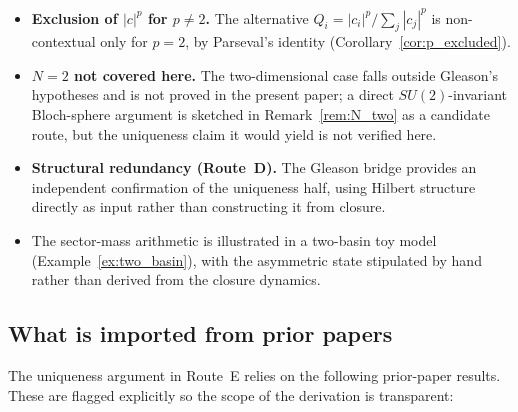 \documentclass[12pt]{article}
\begin{document}
\begin{itemize}
\begin{enumerate}
    \end{enumerate}
    \item \textbf{Exclusion of $|c|^p$ for $p \neq 2$.} The alternative $Q_i = |c_i|^p/\sum_j |c_j|^p$ is non-contextual only for $p = 2$, by Parseval's identity (Corollary~\ref{cor:p_excluded}).
    \item \textbf{$N = 2$ not covered here.} The two-dimensional case falls outside Gleason's hypotheses and is not proved in the present paper; a direct $SU(2)$-invariant Bloch-sphere argument is sketched in Remark~\ref{rem:N_two} as a candidate route, but the uniqueness claim it would yield is not verified here.
    \item \textbf{Structural redundancy (Route~D).} The Gleason bridge provides an independent confirmation of the uniqueness half, using Hilbert structure directly as input rather than constructing it from closure.
    \item The sector-mass arithmetic is illustrated in a two-basin toy model (Example~\ref{ex:two_basin}), with the asymmetric state stipulated by hand rather than derived from the closure dynamics.
\end{itemize}

\subsection{What is imported from prior papers}

The uniqueness argument in Route~E relies on the following prior-paper results. These are flagged explicitly so the scope of the derivation is transparent:
\end{document}
